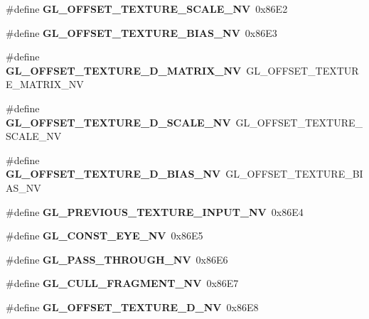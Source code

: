 \begin{DoxyCompactItemize}
\item 
\#define {\bfseries G\+L\+\_\+\+O\+F\+F\+S\+E\+T\+\_\+\+T\+E\+X\+T\+U\+R\+E\+\_\+\+S\+C\+A\+L\+E\+\_\+\+N\+V}~0x86\+E2\label{_s_d_l__opengl_8h_a9f16d4d5e18720bbf9f22f271f10f00f}

\item 
\#define {\bfseries G\+L\+\_\+\+O\+F\+F\+S\+E\+T\+\_\+\+T\+E\+X\+T\+U\+R\+E\+\_\+\+B\+I\+A\+S\+\_\+\+N\+V}~0x86\+E3\label{_s_d_l__opengl_8h_a5e6ec56fcbbceedb60992db867b63fe2}

\item 
\#define {\bfseries G\+L\+\_\+\+O\+F\+F\+S\+E\+T\+\_\+\+T\+E\+X\+T\+U\+R\+E\+\_\+D\+\_\+\+M\+A\+T\+R\+I\+X\+\_\+\+N\+V}~G\+L\+\_\+\+O\+F\+F\+S\+E\+T\+\_\+\+T\+E\+X\+T\+U\+R\+E\+\_\+\+M\+A\+T\+R\+I\+X\+\_\+\+N\+V\label{_s_d_l__opengl_8h_a8f1c744e38444eccbd3b0468db93500c}

\item 
\#define {\bfseries G\+L\+\_\+\+O\+F\+F\+S\+E\+T\+\_\+\+T\+E\+X\+T\+U\+R\+E\+\_\+D\+\_\+\+S\+C\+A\+L\+E\+\_\+\+N\+V}~G\+L\+\_\+\+O\+F\+F\+S\+E\+T\+\_\+\+T\+E\+X\+T\+U\+R\+E\+\_\+\+S\+C\+A\+L\+E\+\_\+\+N\+V\label{_s_d_l__opengl_8h_acbf3434a82a2c09271e8b9182a8a024b}

\item 
\#define {\bfseries G\+L\+\_\+\+O\+F\+F\+S\+E\+T\+\_\+\+T\+E\+X\+T\+U\+R\+E\+\_\+D\+\_\+\+B\+I\+A\+S\+\_\+\+N\+V}~G\+L\+\_\+\+O\+F\+F\+S\+E\+T\+\_\+\+T\+E\+X\+T\+U\+R\+E\+\_\+\+B\+I\+A\+S\+\_\+\+N\+V\label{_s_d_l__opengl_8h_acaa73746324416aba5fd0f4eac797491}

\item 
\#define {\bfseries G\+L\+\_\+\+P\+R\+E\+V\+I\+O\+U\+S\+\_\+\+T\+E\+X\+T\+U\+R\+E\+\_\+\+I\+N\+P\+U\+T\+\_\+\+N\+V}~0x86\+E4\label{_s_d_l__opengl_8h_a777bbfa42658ab348f7f8d945a6667b9}

\item 
\#define {\bfseries G\+L\+\_\+\+C\+O\+N\+S\+T\+\_\+\+E\+Y\+E\+\_\+\+N\+V}~0x86\+E5\label{_s_d_l__opengl_8h_a190e1c02a523f98a8a9df4277c569424}

\item 
\#define {\bfseries G\+L\+\_\+\+P\+A\+S\+S\+\_\+\+T\+H\+R\+O\+U\+G\+H\+\_\+\+N\+V}~0x86\+E6\label{_s_d_l__opengl_8h_a19c58a991e692368f8d79dba02e4e6a7}

\item 
\#define {\bfseries G\+L\+\_\+\+C\+U\+L\+L\+\_\+\+F\+R\+A\+G\+M\+E\+N\+T\+\_\+\+N\+V}~0x86\+E7\label{_s_d_l__opengl_8h_ad7f4946a511e88becb3dd04e9efad0fd}

\item 
\#define {\bfseries G\+L\+\_\+\+O\+F\+F\+S\+E\+T\+\_\+\+T\+E\+X\+T\+U\+R\+E\+\_\+D\+\_\+\+N\+V}~0x86\+E8\label{_s_d_l__opengl_8h_a38bbc1682b0b12cb0080d963b953d5f5}


\end{DoxyCompactItemize}
